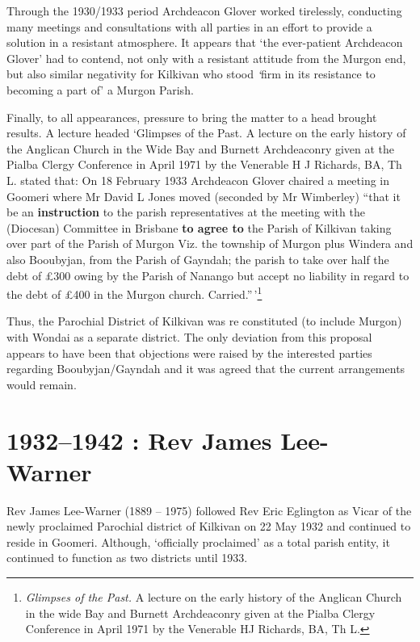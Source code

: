 Through the 1930/1933 period Archdeacon Glover worked tirelessly,
conducting many meetings and consultations with all parties in an effort
to provide a solution in a resistant atmosphere. It appears that `the
ever-patient Archdeacon Glover' had to contend, not only with a
resistant attitude from the Murgon end, but also similar negativity for
Kilkivan who stood \emph{`}firm in its resistance to becoming a part of'
a Murgon Parish.

Finally, to all appearances, pressure to bring the matter to a head
brought results. A lecture headed `Glimpses of the Past. A lecture on
the early history of the Anglican Church in the Wide Bay and Burnett
Archdeaconry given at the Pialba Clergy Conference in April 1971 by the
Venerable H J Richards, BA, Th L. stated that: On 18 February 1933
Archdeacon Glover chaired a meeting in Goomeri where Mr David L Jones
moved (seconded by Mr Wimberley) ``that it be an \textbf{instruction} to
the parish representatives at the meeting with the (Diocesan) Committee
in Brisbane \textbf{to agree to} the Parish of Kilkivan taking over part
of the Parish of Murgon Viz. the township of Murgon plus Windera and
also Booubyjan, from the Parish of Gayndah; the parish to take over half
the debt of \pounds300 owing by the Parish of Nanango but accept no liability
in regard to the debt of \pounds400 in the Murgon church.
Carried.''\,'\footnote{\emph{Glimpses of the Past.} A lecture on the
  early history of the Anglican Church in the wide Bay and Burnett
  Archdeaconry given at the Pialba Clergy Conference in April 1971 by
  the Venerable HJ Richards, BA, Th L.}

Thus, the Parochial District of Kilkivan was re constituted (to include
Murgon) with Wondai as a separate district. The only deviation from this
proposal appears to have been that objections were raised by the
interested parties regarding Booubyjan/Gayndah and it was agreed that
the current arrangements would remain.

\printendnotes[custom]
\setcounter{endnote}{0}
\chapter{1932--1942 : Rev James Lee-Warner}

Rev James Lee-Warner (1889 -- 1975) followed Rev Eric Eglington as Vicar
of the newly proclaimed Parochial district of Kilkivan on 22 May 1932
and continued to reside in Goomeri. Although, `officially proclaimed' as
a total parish entity, it continued to function as two districts until
1933.

